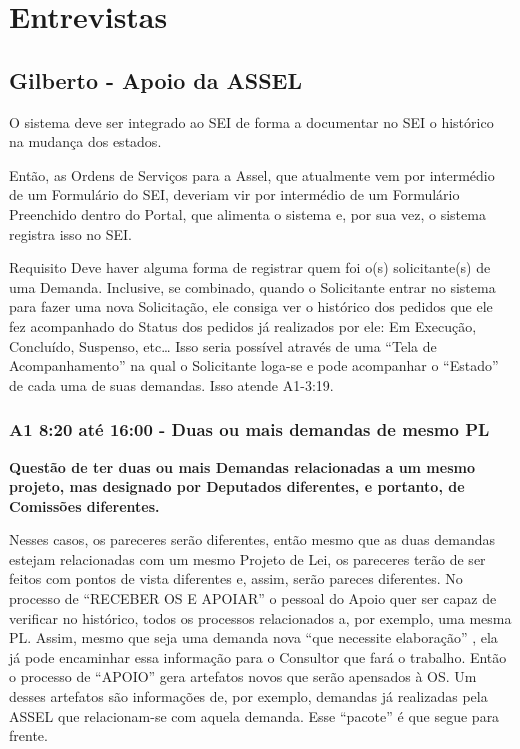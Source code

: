 \chapter{Entrevistas}

\section{Gilberto - Apoio da ASSEL}

O sistema deve ser integrado ao SEI de forma a documentar no SEI o histórico na mudança dos estados.

Então, as Ordens de Serviços para a Assel, que atualmente vem por intermédio de um Formulário do SEI, deveriam vir por intermédio de um Formulário Preenchido dentro do Portal, que alimenta o sistema e, por sua vez, o sistema registra isso no SEI.

\begin{requisito}{Requisito}
	Deve haver alguma forma de registrar quem foi o(s) solicitante(s) de uma Demanda. Inclusive, se combinado, quando o Solicitante entrar no sistema para fazer uma nova Solicitação, ele consiga ver o histórico dos pedidos que ele fez acompanhado do Status dos pedidos já realizados por ele: Em Execução, Concluído, Suspenso, etc… Isso seria possível através de uma ``Tela de Acompanhamento'' na qual o Solicitante loga-se e pode acompanhar o ``Estado'' de cada uma de suas demandas. Isso atende A1-3:19.
\end{requisito}

\subsection{A1 8:20 até 16:00 - Duas ou mais demandas de mesmo PL}

	\textbf{Questão de ter duas ou mais Demandas relacionadas a um mesmo projeto, mas designado por Deputados diferentes, e portanto, de Comissões diferentes.} 
  
	Nesses casos, os pareceres serão diferentes, então mesmo que as duas demandas estejam relacionadas com um mesmo Projeto de Lei, os pareceres terão de ser feitos com pontos de vista diferentes e, assim, serão pareces diferentes. No processo de “RECEBER OS E APOIAR” o pessoal do Apoio quer ser capaz de verificar no histórico, todos os processos relacionados a, por exemplo, uma mesma PL. Assim, mesmo que seja uma demanda nova “que necessite elaboração” , ela já pode encaminhar essa informação para o Consultor que fará o trabalho. Então o processo de “APOIO” gera artefatos novos que serão apensados à OS. Um desses artefatos são informações de, por exemplo, demandas já realizadas pela ASSEL que relacionam-se com aquela demanda. Esse “pacote”  é que segue para frente.

